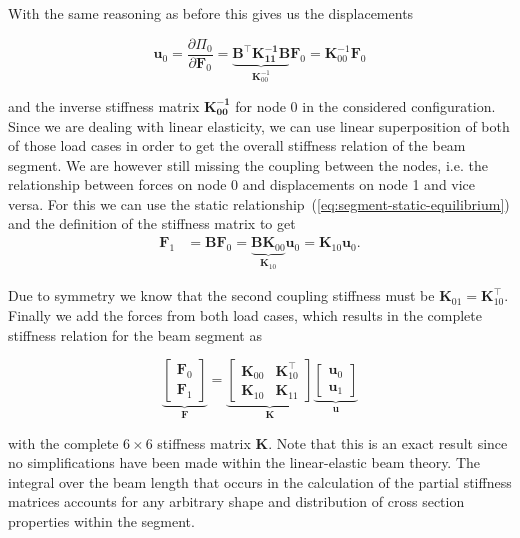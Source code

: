 With the same reasoning as before this gives us the displacements

\begin{equation}
\boldsymbol{u}_{0} = \frac{\partial \Pi_0}{\partial \boldsymbol{F}_0} = \underbrace{\boldsymbol{B}^\intercal\boldsymbol{K_{11}^{-1}\boldsymbol{B}}}_{\boldsymbol{K}_{00}^{-1}}\boldsymbol{F}_0 = \boldsymbol{K}_{00}^{-1}\boldsymbol{F}_0
\end{equation}

and the inverse stiffness matrix $\boldsymbol{\boldsymbol{K}_{00}^{-1}}$ for node 0 in the considered configuration.
Since we are dealing with linear elasticity, we can use linear superposition of both of those load cases in order to get the overall stiffness relation of the beam segment.
We are however still missing the coupling between the nodes, i.e. the relationship between forces on node 0 and displacements on node 1 and vice versa.
For this we can use the static relationship~(\ref{eq:segment-static-equilibrium}) and the definition of the stiffness matrix to get
%
\begin{align}
\boldsymbol{F}_1 &= \boldsymbol{B}\boldsymbol{F}_0 = \underbrace{\boldsymbol{B}\boldsymbol{K}_{00}}_{\boldsymbol{K}_{10}}\boldsymbol{u}_0 = \boldsymbol{K}_{10}\boldsymbol{u}_0.
\end{align}

Due to symmetry we know that the second coupling stiffness must be $\boldsymbol{K}_{01} = \boldsymbol{K}_{10}^\intercal$.
Finally we add the forces from both load cases, which results in the complete stiffness relation for the beam segment as

\begin{equation}
\underbrace{
\begin{bmatrix}
\boldsymbol{F}_0 \\ \boldsymbol{F}_1
\end{bmatrix}
}_{\boldsymbol{F}}
=
\underbrace{
\begin{bmatrix}
\boldsymbol{K}_{00} & \boldsymbol{K}_{10}^\intercal \\
\boldsymbol{K}_{10} & \boldsymbol{K}_{11}
\end{bmatrix}
}_{\boldsymbol{K}}
\underbrace{
\begin{bmatrix}
\boldsymbol{u}_0 \\ \boldsymbol{u}_1
\end{bmatrix}
}_{\boldsymbol{u}} \label{eq:segment-stiffness-matrix}
\end{equation}

with the complete $6 \times 6$ stiffness matrix $\boldsymbol{K}$.
Note that this is an exact result since no simplifications have been made within the linear-elastic beam theory.
The integral over the beam length that occurs in the calculation of the partial stiffness matrices accounts for any arbitrary shape and distribution of cross section properties within the segment.


